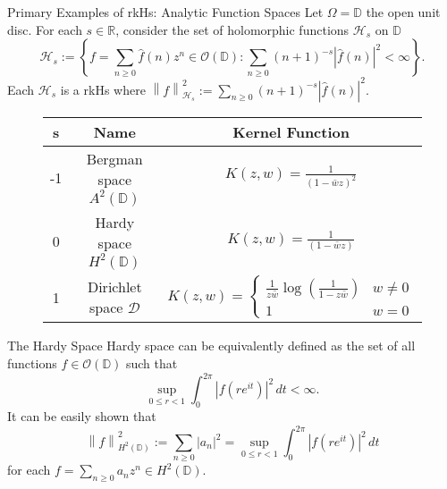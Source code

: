 \documentclass[handout]{beamer}
\newcommand{\R}{\mathbb R}
\newcommand{\D}{\mathbb D}
\newcommand{\calD}{{\mathcal D}}
\newcommand{\calH}{{\mathcal H}}
\newcommand{\calO}{{\mathcal O}}
\newcommand{\norm}[1]{\left\lVert #1 \right\rVert}
\newcommand{\abs}[1]{\left\lvert #1 \right\rvert}
\begin{document}
\begin{frame}{Primary Examples of rkHs: Analytic Function Spaces}
Let $\Omega = \D$ the open unit disc. For each $s\in \R$, consider the set of holomorphic functions $\calH _{s}$ on $\D$
\begin{equation}
\calH _{s} := \left\{ f=\sum_{n \ge 0} \hat{f}\left( n \right) z^{n} \in \calO \left( \D \right) : \sum_{n\ge 0} \left( n+1 \right)^{-s}\abs{\hat{f}(n)}^{2}  < \infty \right\}.
\end{equation}
Each $\calH_{s}$ is a rkHs where $\norm{f}_{\calH_{s}}^{2} := \sum_{n\ge 0} \left( n+1 \right)^{-s}\abs{\hat{f}(n)}^{2}$.
\pause
\begin{figure}
\begin{tabular}{ | c | c c | } 
\hline
 s & Name & Kernel Function \\ 
 \hline
 -1 & Bergman space $A^{2} \left( \D \right)$ & $ K(z,w) = \frac{1}{\left( 1-\bar{w}z \right)^{2}}$ \\
 0 & Hardy space $H^{2} \left( \D \right)$ & $ K(z,w) = \frac{1}{\left( 1-\bar{w}z \right)}$ \\ 
 1 & Dirichlet space $\calD$ & $K(z,w) = \begin{cases} \frac{1}{z\bar{w}} \log \left( \frac{1}{1-z\bar{w}} \right) & w \ne 0 \\ 1 & w= 0 \end{cases}$ \\
 \hline 
\end{tabular}
\end{figure}
\end{frame}
\begin{frame}{The Hardy Space}
Hardy space can be equivalently defined as the set of all functions $f \in \calO \left( \D \right)$ such that 
\begin{equation*}
\sup_{0\le r < 1} \int_{0}^{2\pi} \abs{f\left( re^{it} \right)}^{2} \, dt < \infty.
\end{equation*}
\pause
It can be easily shown that
\begin{equation*}
\norm{f}_{H^{2} \left( \D \right)} ^{2} := \sum_{n\ge 0} \abs{a_{n}}^{2} = \sup_{0\le r < 1} \int_{0}^{2\pi} \abs{f\left( re^{it} \right)}^{2} \, dt
\end{equation*}
for each $f= \sum_{n\ge 0} a_{n} z^{n} \in H^{2} \left( \D \right)$.
\end{frame}
\end{document}
